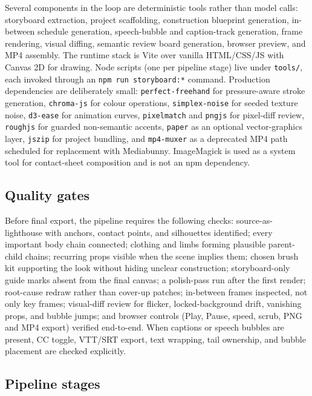 \documentclass[10pt,twocolumn]{article}
\begin{document}
Several components in the loop are deterministic tools rather than
model calls: storyboard extraction, project scaffolding,
construction blueprint generation, in-between schedule generation,
speech-bubble and caption-track generation, frame rendering, visual
diffing, semantic review board generation, browser preview, and MP4
assembly. The runtime stack is Vite over vanilla HTML/CSS/JS with
Canvas 2D for drawing. Node scripts (one per pipeline stage) live
under \texttt{tools/}, each invoked through an \texttt{npm run
storyboard:*} command. Production dependencies are deliberately
small: \texttt{perfect-freehand} for pressure-aware stroke
generation, \texttt{chroma-js} for colour operations,
\texttt{simplex-noise} for seeded texture noise, \texttt{d3-ease}
for animation curves, \texttt{pixelmatch} and \texttt{pngjs} for
pixel-diff review, \texttt{roughjs} for guarded non-semantic
accents, \texttt{paper} as an optional vector-graphics layer,
\texttt{jszip} for project bundling, and \texttt{mp4-muxer} as a
deprecated MP4 path scheduled for replacement with Mediabunny.
ImageMagick is used as a system tool for contact-sheet composition
and is not an npm dependency.

\subsection{Quality gates}

Before final export, the pipeline requires the following checks:
source-as-lighthouse with anchors, contact points, and silhouettes
identified; every important body chain connected; clothing and limbs
forming plausible parent-child chains; recurring props visible when
the scene implies them; chosen brush kit supporting the look without
hiding unclear construction; storyboard-only guide marks absent from
the final canvas; a polish-pass run after the first render;
root-cause redraw rather than cover-up patches; in-between frames
inspected, not only key frames; visual-diff review for flicker,
locked-background drift, vanishing props, and bubble jumps; and
browser controls (Play, Pause, speed, scrub, PNG and MP4 export)
verified end-to-end. When captions or speech bubbles are present, CC
toggle, VTT/SRT export, text wrapping, tail ownership, and bubble
placement are checked explicitly.

\subsection{Pipeline stages}
\end{document}
